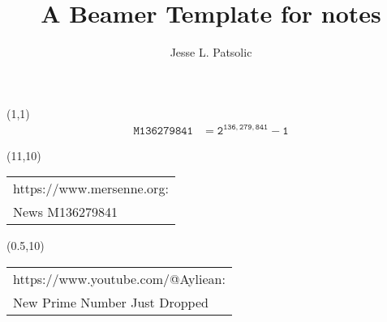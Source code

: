 \documentclass[xcolor=dvipsnames, aspectratio=169]{beamer}
\title[Daily Notes]{A Beamer Template for notes}
\subtitle[]{}
\author[JLP]{Jesse L. Patsolic}
\begin{document}
\begin{frame}[plain]
\begin{textblock}{3}(1,1)
    \hfill
    {\color{DarkRed}
    \huge{
	\begin{align*}
		\mathtt{M136279841} &= \mathtt{2^{136,279,841} - 1}
	\end{align*}
    }
}
    \hfill
\end{textblock}

\begin{textblock}{3.25}(11,10)
    \hspace{1mm}
	{\color{black!70}
	}\\%
	{\color{black!70}
	{\small
	\begin{tabular}{l}
	https://www.mersenne.org:\\ 
	News M136279841
	\end{tabular}
	}
	}
\end{textblock}
\begin{textblock}{3.25}(0.5,10)
    \hspace{1mm}
    {\color{black!70}
	}\\%
	{\color{black!70}
	{\small
	\begin{tabular}{l}
	https://www.youtube.com/@Ayliean:\\ 
	New Prime Number Just Dropped
	\end{tabular}
	}
	}
\end{textblock}
\end{frame}
\end{document}
